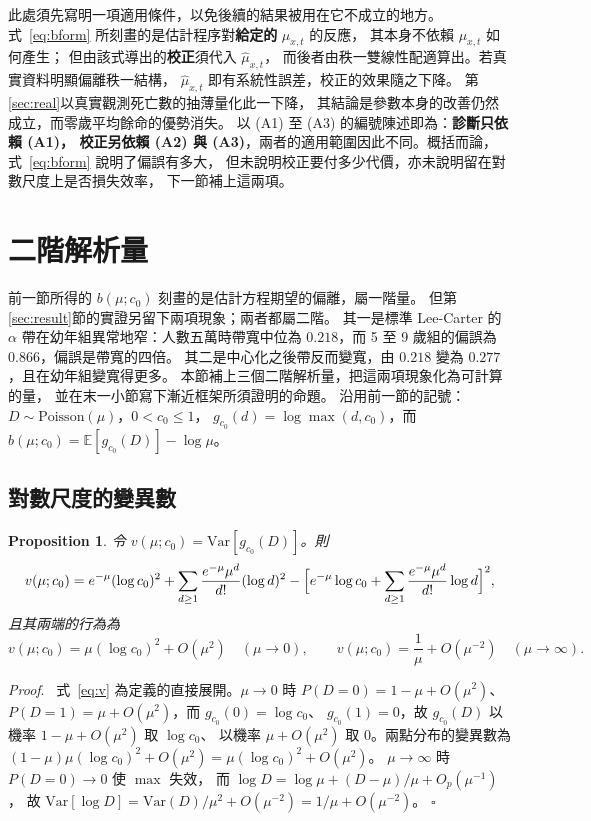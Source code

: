 \documentclass[UTF8, fontset=macnew, a4paper, 12pt]{ctexart}
\newtheorem{prop}{Proposition}
\newenvironment{proof}{\par\noindent\textit{Proof}.\ }{\hfill$\square$\par\vspace{4pt}}
\newcommand{\Ex}{\mathbb{E}}
\begin{document}
此處須先寫明一項適用條件，以免後續的結果被用在它不成立的地方。
式~\eqref{eq:bform} 所刻畫的是估計程序對\textbf{給定的} $\mu_{x,t}$ 的反應，
其本身不依賴 $\mu_{x,t}$ 如何產生；
但由該式導出的\textbf{校正}須代入 $\hat\mu_{x,t}$，
而後者由秩一雙線性配適算出。若真實資料明顯偏離秩一結構，
$\hat\mu_{x,t}$ 即有系統性誤差，校正的效果隨之下降。
第\ref{sec:real}以真實觀測死亡數的抽薄量化此一下降，
其結論是參數本身的改善仍然成立，而零歲平均餘命的優勢消失。
以 (A1) 至 (A3) 的編號陳述即為：\textbf{診斷只依賴 (A1)，
校正另依賴 (A2) 與 (A3)}，兩者的適用範圍因此不同。概括而論，式~\eqref{eq:bform} 說明了偏誤有多大，
但未說明校正要付多少代價，亦未說明留在對數尺度上是否損失效率，
下一節補上這兩項。


\section{二階解析量}\label{sec:second2}

前一節所得的 $b(\mu;c_0)$ 刻畫的是估計方程期望的偏離，屬一階量。
但第\ref{sec:result}節的實證另留下兩項現象；兩者都屬二階。
其一是標準 Lee-Carter 的 $\alpha$ 帶在幼年組異常地窄：人數五萬時帶寬中位為
$0.218$，而 5 至 9 歲組的偏誤為 $0.866$，偏誤是帶寬的四倍。
其二是中心化之後帶反而變寬，由 $0.218$ 變為 $0.277$，且在幼年組變寬得更多。
本節補上三個二階解析量，把這兩項現象化為可計算的量，
並在末一小節寫下漸近框架所須證明的命題。
沿用前一節的記號：$D\sim\text{Poisson}(\mu)$，$0<c_0\le1$，
$g_{c_0}(d)=\log\max(d,c_0)$，而 $b(\mu;c_0)=\Ex[g_{c_0}(D)]-\log\mu$。

\subsection{對數尺度的變異數}\label{subsec:vfun}

\begin{prop}\label{prop:v}
令 $v(\mu;c_0)=\mathrm{Var}[g_{c_0}(D)]$。則
\begin{equation}\label{eq:v}
v(\mu;c_0)=e^{-\mu}(\log c_0)^2+\sum_{d\ge1}\frac{e^{-\mu}\mu^{d}}{d!}(\log d)^2
-\Bigl[e^{-\mu}\log c_0+\sum_{d\ge1}\frac{e^{-\mu}\mu^{d}}{d!}\log d\Bigr]^{2},
\end{equation}
且其兩端的行為為
\[
v(\mu;c_0)=\mu(\log c_0)^2+O(\mu^2)\quad(\mu\to0),\qquad
v(\mu;c_0)=\frac{1}{\mu}+O(\mu^{-2})\quad(\mu\to\infty).
\]
\end{prop}

\begin{proof}
式~\eqref{eq:v} 為定義的直接展開。$\mu\to0$ 時
$P(D=0)=1-\mu+O(\mu^2)$、$P(D=1)=\mu+O(\mu^2)$，而 $g_{c_0}(0)=\log c_0$、
$g_{c_0}(1)=0$，故 $g_{c_0}(D)$ 以機率 $1-\mu+O(\mu^2)$ 取 $\log c_0$、
以機率 $\mu+O(\mu^2)$ 取 $0$。兩點分布的變異數為
$(1-\mu)\mu(\log c_0)^2+O(\mu^2)=\mu(\log c_0)^2+O(\mu^2)$。
$\mu\to\infty$ 時 $P(D=0)\to0$ 使 $\max$ 失效，
而 $\log D=\log\mu+(D-\mu)/\mu+O_p(\mu^{-1})$，
故 $\mathrm{Var}[\log D]=\mathrm{Var}(D)/\mu^2+O(\mu^{-2})=1/\mu+O(\mu^{-2})$。
\end{proof}
\end{document}

